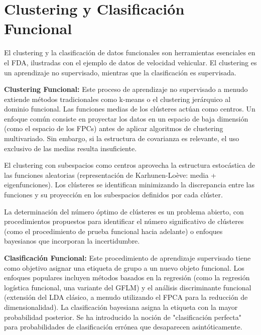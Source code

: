 \documentclass{article}
\begin{document}
\section*{\large Clustering y Clasificación Funcional}
El clustering y la clasificación de datos funcionales son herramientas esenciales en el FDA, ilustradas con el ejemplo de datos de velocidad vehicular. El clustering es un aprendizaje no supervisado, mientras que la clasificación es supervisada.

\vspace{0.35cm}\noindent
\textbf{Clustering Funcional:} Este proceso de aprendizaje no supervisado a menudo extiende métodos tradicionales como k-means o el clustering jerárquico al dominio funcional. Las funciones medias de los clústeres actúan como centros. Un enfoque común consiste en proyectar los datos en un espacio de baja dimensión (como el espacio de los FPCs) antes de aplicar algoritmos de clustering multivariado. Sin embargo, si la estructura de covarianza es relevante, el uso exclusivo de las medias resulta insuficiente.

\vspace{0.35cm}\noindent
El clustering con subespacios como centros aprovecha la estructura estocástica de las funciones aleatorias (representación de Karhunen-Loève: media + eigenfunciones). Los clústeres se identifican minimizando la discrepancia entre las funciones y su proyección en los subespacios definidos por cada clúster.

\vspace{0.35cm}\noindent
La determinación del número óptimo de clústeres es un problema abierto, con procedimientos propuestos para identificar el número significativo de clústeres (como el procedimiento de prueba funcional hacia adelante) o enfoques bayesianos que incorporan la incertidumbre.

\vspace{0.35cm}\noindent
\textbf{Clasificación Funcional:} Este procedimiento de aprendizaje supervisado tiene como objetivo asignar una etiqueta de grupo a un nuevo objeto funcional. Los enfoques populares incluyen métodos basados en la regresión (como la regresión logística funcional, una variante del GFLM) y el análisis discriminante funcional (extensión del LDA clásico, a menudo utilizando el FPCA para la reducción de dimensionalidad). La clasificación bayesiana asigna la etiqueta con la mayor probabilidad posterior. Se ha introducido la noción de "clasificación perfecta" para probabilidades de clasificación errónea que desaparecen asintóticamente.
\end{document}
